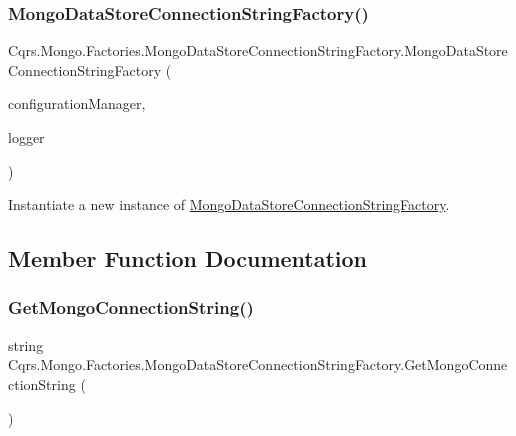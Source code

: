 \subsubsection{\texorpdfstring{Mongo\+Data\+Store\+Connection\+String\+Factory()}{MongoDataStoreConnectionStringFactory()}}
{\footnotesize\ttfamily Cqrs.\+Mongo.\+Factories.\+Mongo\+Data\+Store\+Connection\+String\+Factory.\+Mongo\+Data\+Store\+Connection\+String\+Factory (\begin{DoxyParamCaption}\item[{\hyperlink{interfaceCqrs_1_1Configuration_1_1IConfigurationManager}{I\+Configuration\+Manager}}]{configuration\+Manager,  }\item[{I\+Logger}]{logger }\end{DoxyParamCaption})}



Instantiate a new instance of \hyperlink{classCqrs_1_1Mongo_1_1Factories_1_1MongoDataStoreConnectionStringFactory}{Mongo\+Data\+Store\+Connection\+String\+Factory}. 



\subsection{Member Function Documentation}
\mbox{\label{classCqrs_1_1Mongo_1_1Factories_1_1MongoDataStoreConnectionStringFactory_a33064b1b1cbf06ef4f9e12371c7ef785_a33064b1b1cbf06ef4f9e12371c7ef785}} 
\subsubsection{\texorpdfstring{Get\+Mongo\+Connection\+String()}{GetMongoConnectionString()}}
{\footnotesize\ttfamily string Cqrs.\+Mongo.\+Factories.\+Mongo\+Data\+Store\+Connection\+String\+Factory.\+Get\+Mongo\+Connection\+String (\begin{DoxyParamCaption}{ }\end{DoxyParamCaption})}



